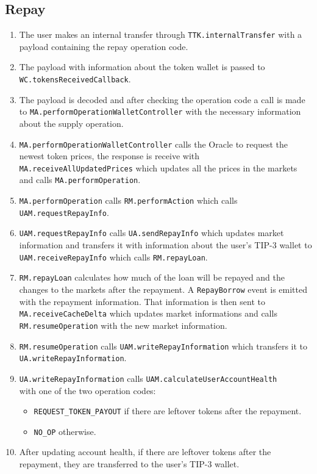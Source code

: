 \subsection{Repay}
\begin{enumerate}
  \item The user makes an internal transfer through \verb|TTK.internalTransfer| with a payload containing the repay operation code.
  \item The payload with information about the token wallet is passed to \\\verb|WC.tokensReceivedCallback|.
  \item The payload is decoded and after checking the operation code a call is made to \verb|MA.performOperationWalletController| with the necessary information about the supply operation.
  \item \verb|MA.performOperationWalletController| calls the Oracle to request the newest token prices, the response is receive with \\\verb|MA.receiveAllUpdatedPrices| which updates all the prices in the markets and calls \verb|MA.performOperation|.
  \item \verb|MA.performOperation| calls \verb|RM.performAction| which calls \\\verb|UAM.requestRepayInfo|.
  \item \verb|UAM.requestRepayInfo| calls \verb|UA.sendRepayInfo| which updates market information and transfers it with information about the user's TIP-3 wallet to \verb|UAM.receiveRepayInfo| which calls \verb|RM.repayLoan|.
  \item \verb|RM.repayLoan| calculates how much of the loan will be repayed and the changes to the markets after the repayment. A \verb|RepayBorrow| event is emitted with the repayment information. That information is then sent to \verb|MA.receiveCacheDelta| which updates market informations and calls \verb|RM.resumeOperation| with the new market information.
  \item \verb|RM.resumeOperation| calls \verb|UAM.writeRepayInformation| which transfers it to \verb|UA.writeRepayInformation|.
  \item \verb|UA.writeRepayInformation| calls \verb|UAM.calculateUserAccountHealth| \\with one of the two operation codes:
  \begin{itemize}
    \item \verb|REQUEST_TOKEN_PAYOUT| if there are leftover tokens after the repayment.
    \item \verb|NO_OP| otherwise.
  \end{itemize}
  \item After updating account health, if there are leftover tokens after the repayment, they are transferred to the user's TIP-3 wallet.
\end{enumerate}

